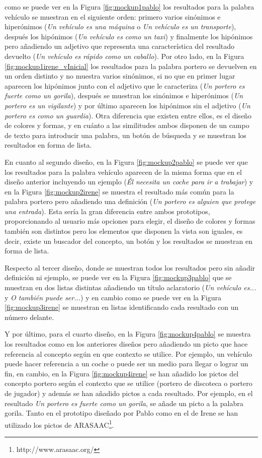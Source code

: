  como se puede ver en la Figura \ref{fig:mockup1pablo} los resultados para la palabra vehículo se muestran en el siguiente orden: primero varios sinónimos e hiperónimos (\textit{Un vehículo es una máquina} o \textit{Un vehículo es un transporte}), después los hipónimos (\textit{Un vehículo es como un taxi}) y finalmente los hipónimos pero añadiendo un adjetivo que representa una característica del resultado devuelto (\textit{Un vehículo es rápido como un caballo}). Por otro lado, en la Figura \ref{fig:mockup1irene_vInicial} los resultados para la palabra portero se devuelven en un orden distinto y no muestra varios sinónimos, si no que en primer lugar aparecen los hipónimos junto con el adjetivo que le caracteriza (\textit{Un portero es fuerte como un gorila}), después se muestran los sinónimos e hiperónimos (\textit{Un portero es un vigilante}) y por último aparecen los hipónimos sin el adjetivo (\textit{Un portero es como un guardia}). Otra diferencia que existen entre ellos, es el diseño de colores y formas, y en cuánto a las similitudes ambos disponen de un campo de texto para introducir una palabra, un botón de búsqueda y se muestran los resultados en forma de lista.

En cuanto al segundo diseño, en la Figura \ref{fig:mockup2pablo} se puede ver que los resultados para la palabra vehículo aparecen de la misma forma que en el diseño anterior incluyendo un ejemplo (\textit{Él necesita un coche para ir a trabajar}) y en la Figura \ref{fig:mockup2irene} se muestra el resultado más común para la palabra portero pero añadiendo una definición (\textit{Un portero es alguien que protege una entrada}). Esta sería la gran diferencia entre ambos prototipos, proporcionando al usuario más opciones para elegir, el diseño de colores y formas también son distintos pero los elementos que disponen la vista son iguales, es decir, existe un buscador del concepto, un botón y los resultados se muestran en forma de lista.

Respecto al tercer diseño, donde se muestran todos los resultados pero sin añadir definición ni ejemplo, se puede ver en la Figura \ref{fig:mockup3pablo} que se muestran en dos listas distintas añadiendo un título aclaratorio (\textit{Un vehículo es...} y \textit{O también puede ser...}) y en cambio como se puede ver en la Figura \ref{fig:mockup3irene} se muestran en listas identificando cada resultado con un número delante.

Y por último, para el cuarto diseño, en la Figura \ref{fig:mockup4pablo} se muestra los resultados como en los anteriores diseños pero añadiendo un picto que hace referencia al concepto según en que contexto se utilice. Por ejemplo, un vehículo puede hacer referencia a un coche o puede ser un medio para llegar o lograr un fin, en cambio, en la Figura \ref{fig:mockup4irene} se han añadido los pictos del concepto portero según el contexto que se utilice (portero de discoteca o portero de jugador) y además se han añadido pictos a cada resultado. Por ejemplo, en el resultado \textit{Un portero es fuerte como un gorila}, se añade un picto a la palabra gorila. 
Tanto en el prototipo diseñado por Pablo como en el de Irene se han utilizado los pictos de ARASAAC\footnote{http://www.arasaac.org/}.

